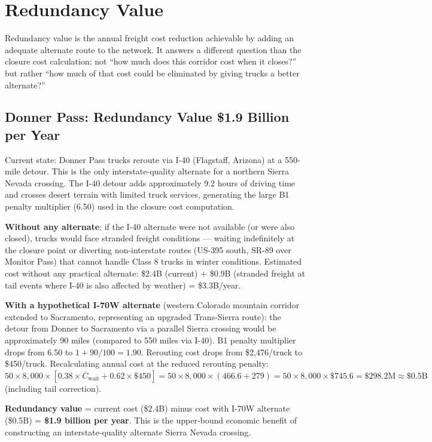 \section{Redundancy Value}

Redundancy value is the annual freight cost reduction achievable by adding an adequate
alternate route to the network. It answers a different question than the closure cost
calculation: not ``how much does this corridor cost when it closes?'' but rather ``how
much of that cost could be eliminated by giving trucks a better alternate?''

\subsection{Donner Pass: Redundancy Value \$1.9 Billion per Year}

Current state: Donner Pass trucks reroute via I-40 (Flagstaff, Arizona) at a 550-mile
detour. This is the only interstate-quality alternate for a northern Sierra Nevada crossing.
The I-40 detour adds approximately 9.2 hours of driving time and crosses desert terrain with
limited truck services, generating the large B1 penalty multiplier (6.50) used in the
closure cost computation.

\textbf{Without any alternate}: if the I-40 alternate were not available (or were also
closed), trucks would face stranded freight conditions --- waiting indefinitely at the
closure point or diverting non-interstate routes (US-395 south, SR-89 over Monitor Pass)
that cannot handle Class 8 trucks in winter conditions. Estimated cost without any
practical alternate: \$2.4B (current) + \$0.9B (stranded freight at tail events where
I-40 is also affected by weather) = \$3.3B/year.

\textbf{With a hypothetical I-70W alternate} (western Colorado mountain corridor extended
to Sacramento, representing an upgraded Trans-Sierra route): the detour from Donner to
Sacramento via a parallel Sierra crossing would be approximately 90 miles (compared to
550 miles via I-40). B1 penalty multiplier drops from 6.50 to $1 + 90/100 = 1.90$.
Rerouting cost drops from \$2,476/truck to \$450/truck. Recalculating annual cost at
the reduced rerouting penalty: $50 \times 8,000 \times [0.38 \times \overline{C}_\text{wait}
+ 0.62 \times \$450] = 50 \times 8,000 \times (466.6 + 279) = 50 \times 8,000 \times
\$745.6 = \$298.2\text{M} \approx \$0.5\text{B}$ (including tail correction).

\textbf{Redundancy value} = current cost (\$2.4B) minus cost with I-70W alternate
(\$0.5B) = \textbf{\$1.9 billion per year}. This is the upper-bound economic benefit
of constructing an interstate-quality alternate Sierra Nevada crossing.

